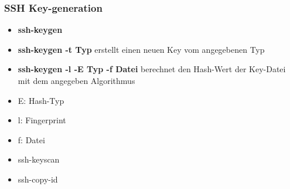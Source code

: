 \begin{frame}
\frametitle{SSH Key-generation}
\begin{itemize}
\item \textbf{ssh-keygen} 
\pause
\item \textbf{ssh-keygen -t Typ} erstellt einen neuen Key vom angegebenen Typ
\pause
\item \textbf{ssh-keygen -l -E Typ -f Datei} berechnet den Hash-Wert der Key-Datei mit dem angegeben Algorithmus
\pause
\item E: Hash-Typ
\pause
\item l: Fingerprint
\pause
\item f: Datei 
\pause
\item ssh-keyscan
\pause
\item ssh-copy-id
\end{itemize}
\end{frame}